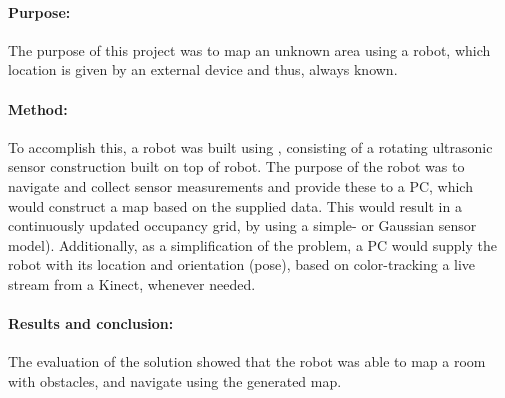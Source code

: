\paragraph{Purpose:}The purpose of this project was to map an unknown area using a robot, which location is given by an external device and thus, always known.

\paragraph{Method:}To accomplish this, a robot was built using \legoms, consisting of a rotating ultrasonic sensor construction built on top of robot.
The purpose of the robot was to navigate and collect sensor measurements and provide these to a PC, which would construct a map based on the supplied data.
This would result in a continuously updated occupancy grid, by using a simple- or Gaussian sensor model).
Additionally, as a simplification of the problem, a PC would supply the robot with its location and orientation (pose), based on color-tracking a live stream from a Kinect, whenever needed.

\paragraph{Results and conclusion:}
The evaluation of the solution showed that the robot was able to map a room with obstacles, and navigate using the generated map.
